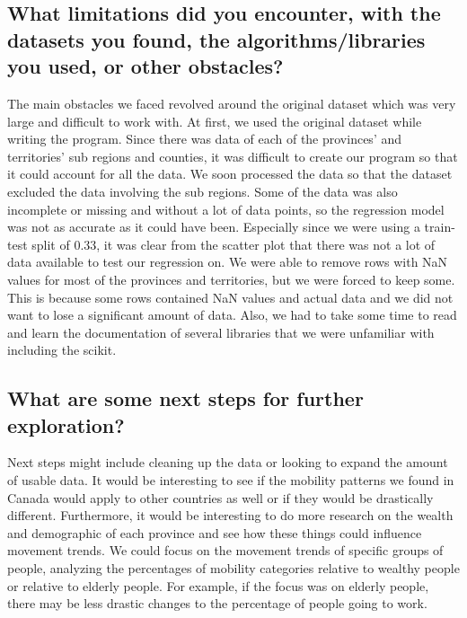 \documentclass[fontsize=11pt]{article}
\begin{document}
    \newpage

    \subsection{What limitations did you encounter, with the datasets you found, the algorithms/libraries you used, or other obstacles?}

    The main obstacles we faced revolved around the original dataset which was very large and difficult to work with. At first, we used the original dataset while writing the program. Since there was data of each of the provinces’ and territories’ sub regions and counties, it was difficult to create our program so that it could account for all the data. We soon processed the data so that the dataset excluded the data involving the sub regions. Some of the data was also incomplete or missing and without a lot of data points, so the regression model was not as accurate as it could have been. Especially since we were using a train-test split of 0.33, it was clear from the scatter plot that there was not a lot of data available to test our regression on. We were able to remove rows with NaN values for most of the provinces and territories, but we were forced to keep some. This is because some rows contained NaN values and actual data and we did not want to lose a significant amount of data. Also, we had to take some time to read and learn the documentation of several libraries that we were unfamiliar with including the scikit.

    \subsection{What are some next steps for further exploration?}

    Next steps might include cleaning up the data or looking to expand the amount of usable data. It would be interesting to see if the mobility patterns we found in Canada would apply to other countries as well or if they would be drastically different. Furthermore, it would be interesting to do more research on the wealth and demographic of each province and see how these things could influence movement trends. We could focus on the movement trends of specific groups of people, analyzing the percentages of mobility categories relative to wealthy people or relative to elderly people. For example, if the focus was on elderly people, there may be less drastic changes to the percentage of people going to work.
\end{document}
